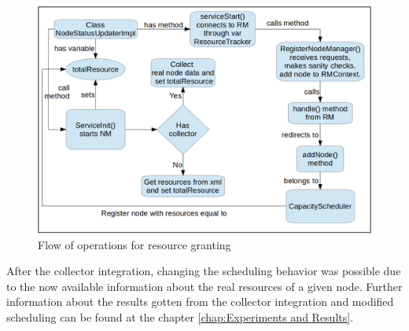 \begin{figure}[!hbtn]
   \renewcommand{\figurename}{Figure}
   \centering
   \includegraphics[width=15cm]{figuras/Figura20-collectorfig.png}
   \caption{Flow of operations for resource granting}
   \label{fig:collectorflow}
\end{figure}

After the collector integration, changing the scheduling behavior was possible due to the now available information about the real resources of a given node. Further information about the results gotten from the collector integration and modified scheduling can be found at the chapter \ref{chap:Experiments and Results}.